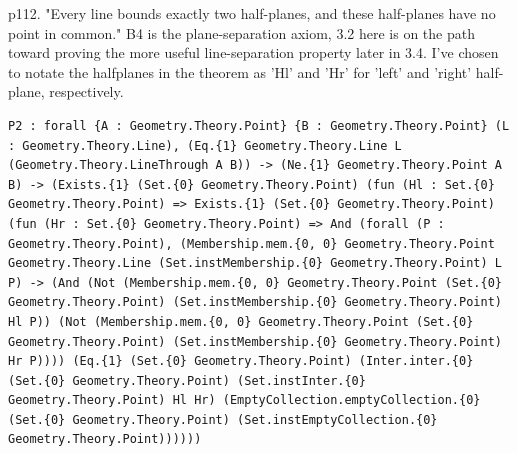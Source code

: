 \begin{theorem}
  \label{Geometry.Ch3.Prop.P2}
  \leanok
  p112. "Every line bounds exactly two half-planes, and these half-planes have no point in common."  B4 is the plane-separation axiom, 3.2 here is on the path toward proving the more useful line-separation property later in 3.4. I've chosen to notate the halfplanes in the theorem as 'Hl' and 'Hr' for 'left' and 'right' half-plane, respectively. 
\begin{verbatim}P2 : forall {A : Geometry.Theory.Point} {B : Geometry.Theory.Point} (L : Geometry.Theory.Line), (Eq.{1} Geometry.Theory.Line L (Geometry.Theory.LineThrough A B)) -> (Ne.{1} Geometry.Theory.Point A B) -> (Exists.{1} (Set.{0} Geometry.Theory.Point) (fun (Hl : Set.{0} Geometry.Theory.Point) => Exists.{1} (Set.{0} Geometry.Theory.Point) (fun (Hr : Set.{0} Geometry.Theory.Point) => And (forall (P : Geometry.Theory.Point), (Membership.mem.{0, 0} Geometry.Theory.Point Geometry.Theory.Line (Set.instMembership.{0} Geometry.Theory.Point) L P) -> (And (Not (Membership.mem.{0, 0} Geometry.Theory.Point (Set.{0} Geometry.Theory.Point) (Set.instMembership.{0} Geometry.Theory.Point) Hl P)) (Not (Membership.mem.{0, 0} Geometry.Theory.Point (Set.{0} Geometry.Theory.Point) (Set.instMembership.{0} Geometry.Theory.Point) Hr P)))) (Eq.{1} (Set.{0} Geometry.Theory.Point) (Inter.inter.{0} (Set.{0} Geometry.Theory.Point) (Set.instInter.{0} Geometry.Theory.Point) Hl Hr) (EmptyCollection.emptyCollection.{0} (Set.{0} Geometry.Theory.Point) (Set.instEmptyCollection.{0} Geometry.Theory.Point))))))\end{verbatim}
\end{theorem}

